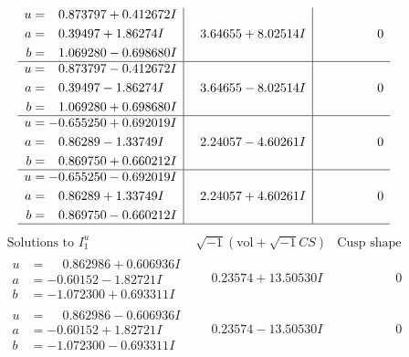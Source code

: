 \documentclass[1p]{elsarticle_modified}
\theoremstyle{definition}
\newcommand{\I}{\sqrt{-1}}
\begin{document}
$$\begin{array}{c|c|c}
\begin{aligned}
u &= \phantom{-}0.873797 + 0.412672 I \\
a &= \phantom{-}0.39497 + 1.86274 I \\
b &= \phantom{-}1.069280 - 0.698680 I\end{aligned}
 & \phantom{-}3.64655 + 8.02514 I & \phantom{-0.000000 } 0 \\ \hline\begin{aligned}
u &= \phantom{-}0.873797 - 0.412672 I \\
a &= \phantom{-}0.39497 - 1.86274 I \\
b &= \phantom{-}1.069280 + 0.698680 I\end{aligned}
 & \phantom{-}3.64655 - 8.02514 I & \phantom{-0.000000 } 0 \\ \hline\begin{aligned}
u &= -0.655250 + 0.692019 I \\
a &= \phantom{-}0.86289 - 1.33749 I \\
b &= \phantom{-}0.869750 + 0.660212 I\end{aligned}
 & \phantom{-}2.24057 - 4.60261 I & \phantom{-0.000000 } 0 \\ \hline\begin{aligned}
u &= -0.655250 - 0.692019 I \\
a &= \phantom{-}0.86289 + 1.33749 I \\
b &= \phantom{-}0.869750 - 0.660212 I\end{aligned}
 & \phantom{-}2.24057 + 4.60261 I & \phantom{-0.000000 } 0\\
 \hline 
 \end{array}$$\newpage$$\begin{array}{c|c|c}  
\text{Solutions to }I^u_{1}& \I (\text{vol} + \sqrt{-1}CS) & \text{Cusp shape}\\
 \hline 
\begin{aligned}
u &= \phantom{-}0.862986 + 0.606936 I \\
a &= -0.60152 - 1.82721 I \\
b &= -1.072300 + 0.693311 I\end{aligned}
 & \phantom{-}0.23574 + 13.50530 I & \phantom{-0.000000 } 0 \\ \hline\begin{aligned}
u &= \phantom{-}0.862986 - 0.606936 I \\
a &= -0.60152 + 1.82721 I \\
b &= -1.072300 - 0.693311 I\end{aligned}
 & \phantom{-}0.23574 - 13.50530 I & \phantom{-0.000000 } 0 \\ \hline\begin{aligned}

\end{aligned}
\end{array}$$
\end{document}
